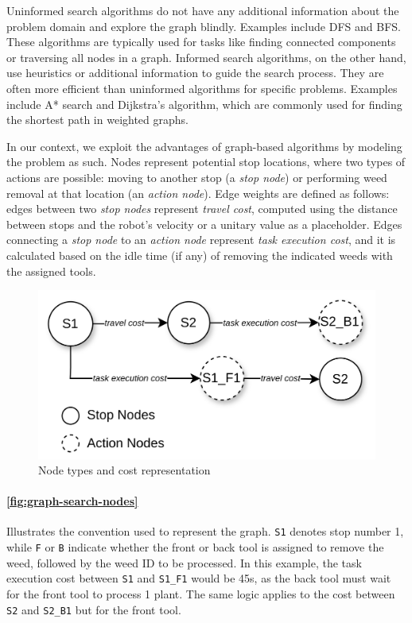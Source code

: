 Uninformed search algorithms do not have any additional information about the problem domain and explore the graph blindly. Examples include \ac{DFS} and \ac{BFS}. These algorithms are typically used for tasks like finding connected components or traversing all nodes in a graph.
Informed search algorithms, on the other hand, use heuristics or additional information to guide the search process. They are often more efficient than uninformed algorithms for specific problems. Examples include A* search and Dijkstra's algorithm, which are commonly used for finding the shortest path in weighted graphs.

In our context, we exploit the advantages of graph-based algorithms by modeling the problem as such. Nodes represent potential stop locations, where two types of actions are possible: moving to another stop (a \textit{stop node}) or performing weed removal at that location (an \textit{action node}). Edge weights are defined as follows: edges between two \textit{stop nodes} represent \textit{travel cost}, computed using the distance between stops and the robot’s velocity or a unitary value as a placeholder. Edges connecting a \textit{stop node} to an \textit{action node} represent \textit{task execution cost}, and it is calculated based on the idle time (if any) of removing the indicated weeds with the assigned tools.

\begin{figure}[hbt]
    \centering
    \includegraphics[width=0.8\linewidth]{gfx/ch02/graph_search_nodes.png}
    \caption{Node types and cost representation}
    \label{fig:graph-search-nodes}
\end{figure}

\paragraph{\autoref{fig:graph-search-nodes}} Illustrates the convention used to represent the graph. \texttt{S1} denotes stop number 1, while \texttt{F} or \texttt{B} indicate whether the front or back tool is assigned to remove the weed, followed by the weed ID to be processed. In this example, the task execution cost between \texttt{S1} and \texttt{S1\_F1} would be 45s, as the back tool must wait for the front tool to process 1 plant. The same logic applies to the cost between \texttt{S2} and \texttt{S2\_B1} but for the front tool.

